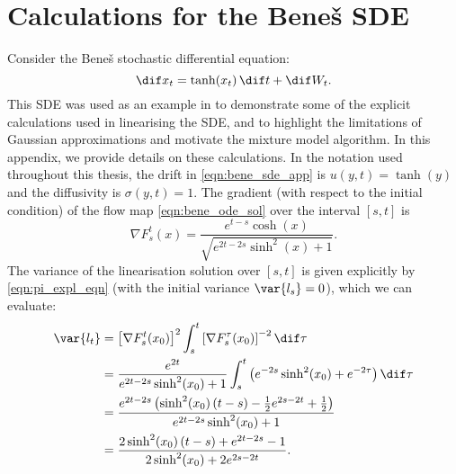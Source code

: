 
\chapter{Calculations for the Bene\v{s} SDE}\label{app:bene_calculations}
Consider the Bene\v{s} stochastic differential equation:
\begin{equation}
	\dif x_t = \tanh\!\left(x_t\right)\dif t + \dif W_t.
	\label{eqn:bene_sde_app}
\end{equation}
This SDE was used as an example in  to demonstrate some of the explicit calculations used in linearising the SDE, and to highlight the limitations of Gaussian approximations and motivate the mixture model algorithm.
In this appendix, we provide details on these calculations.
In the notation used throughout this thesis, the drift in \cref{eqn:bene_sde_app} is \(u\!\left(y,t\right) = \tanh\!\left(y\right)\) and the diffusivity is \(\sigma\!\left(y,t\right) = 1\).
The gradient (with respect to the initial condition) of the flow map \cref{eqn:bene_ode_sol} over the interval \([s,t]\) is
\[
	\nabla F_s^t\!\left(x\right) = \frac{e^{t-s}\cosh\!\left(x\right)}{\sqrt{e^{2t - 2s}\sinh^2\!\left(x\right) + 1}}.
\]
The variance of the linearisation solution over \([s,t]\) is given explicitly by \cref{eqn:pi_expl_eqn} (with the initial variance \(\var{l_s} = 0\)), which we can evaluate:
\begin{align*}
	\var{l_t} & = \left[\nabla F_s^t\!\left(x_0\right)\right]^2\int_s^t{\left[\nabla F_s^\tau\!\left(x_0\right)\right]^{-2}\dif\tau}                        \\
	          & = \frac{e^{2t}}{e^{2t - 2s}\sinh^2\!\left(x_0\right) + 1}\int_s^t{\left(e^{- 2s}\sinh^2\!\left(x_0\right) + e^{- 2\tau}\right)\dif\tau}     \\
	          & = \frac{e^{2t - 2s}\left(\sinh^2\!\left(x_0\right)(t - s) - \frac12 e^{2s - 2t} + \frac12\right)}{e^{2t - 2s}\sinh^2\!\left(x_0\right) + 1} \\
	          & = \frac{2\sinh^2\!\left(x_0\right)\left(t - s\right) + e^{2t - 2s} - 1}{2\sinh^2\!\left(x_0\right) + 2e^{2s - 2t}}.
\end{align*}





